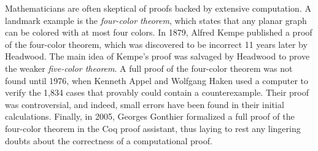 Mathematicians are often skeptical of proofs backed by extensive computation.
A landmark example is the \emph{four-color theorem}, which states that any planar graph can be colored with at most four colors. 
In 1879, Alfred Kempe published a proof of the four-color theorem, which was discovered to be incorrect 11 years later by Headwood. 
The main idea of Kempe's proof was salvaged by Headwood to prove the weaker \emph{five-color theorem}. 
A full proof of the four-color theorem was not found until 1976, when Kenneth Appel and Wolfgang Haken used a computer to verify the 1,834 cases that provably could contain a counterexample.
Their proof was controversial, and indeed, small errors have been found in their initial calculations.
Finally, in 2005, Georges Gonthier formalized a full proof of the four-color theorem in the \textsf{Coq} proof assistant, thus laying to rest any lingering doubts about the correctness of a computational proof.